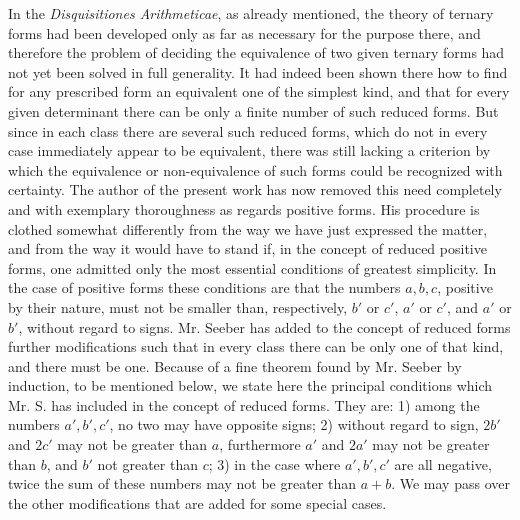 \documentclass[12pt]{article}
\begin{document}
In the \textit{Disquisitiones Arithmeticae}, as already mentioned, the theory of ternary forms had been developed only as far as necessary for the purpose there, and therefore the problem of deciding the equivalence of two given ternary forms had not yet been solved in full generality. It had indeed been shown there how to find for any prescribed form an equivalent one of the simplest kind, and that for every given determinant there can be only a finite number of such reduced forms. But since in each class there are several such reduced forms, which do not in every case immediately appear to be equivalent, there was still lacking a criterion by which the equivalence or non-equivalence of such forms could be recognized with certainty. The author of the present work has now removed this need completely and with exemplary thoroughness as regards positive forms. His procedure is clothed somewhat differently from the way we have just expressed the matter, and from the way it would have to stand if, in the concept of reduced positive forms, one admitted only the most essential conditions of greatest simplicity. In the case of positive forms these conditions are that the numbers $a,b,c$, positive by their nature, must not be smaller than, respectively, $b'$ or $c'$, $a'$ or $c'$, and $a'$ or $b'$, without regard to signs. Mr. Seeber has added to the concept of reduced forms further modifications such that in every class there can be only one of that kind, and there must be one. Because of a fine theorem found by Mr. Seeber by induction, to be mentioned below, we state here the principal conditions which Mr. S. has included in the concept of reduced forms. They are: 1) among the numbers $a',b',c'$, no two may have opposite signs; 2) without regard to sign, $2b'$ and $2c'$ may not be greater than $a$, furthermore $a'$ and $2a'$ may not be greater than $b$, and $b'$ not greater than $c$; 3) in the case where $a',b',c'$ are all negative, twice the sum of these numbers may not be greater than $a+b$. We may pass over the other modifications that are added for some special cases.
\end{document}
